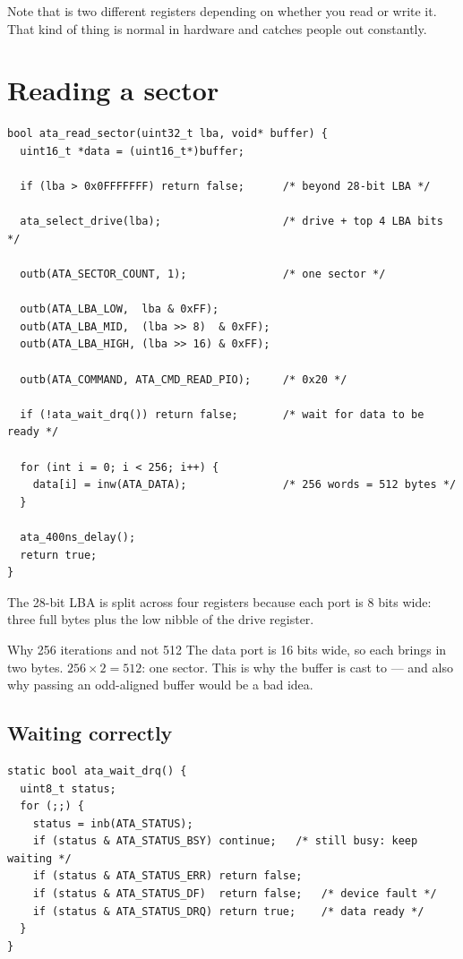 Note that  is two different registers depending on whether you read or write it. That kind
of thing is normal in hardware and catches people out constantly.

\section{Reading a sector}

\begin{lstlisting}[style=c]
bool ata_read_sector(uint32_t lba, void* buffer) {
  uint16_t *data = (uint16_t*)buffer;

  if (lba > 0x0FFFFFFF) return false;      /* beyond 28-bit LBA */

  ata_select_drive(lba);                   /* drive + top 4 LBA bits */

  outb(ATA_SECTOR_COUNT, 1);               /* one sector */

  outb(ATA_LBA_LOW,  lba & 0xFF);
  outb(ATA_LBA_MID,  (lba >> 8)  & 0xFF);
  outb(ATA_LBA_HIGH, (lba >> 16) & 0xFF);

  outb(ATA_COMMAND, ATA_CMD_READ_PIO);     /* 0x20 */

  if (!ata_wait_drq()) return false;       /* wait for data to be ready */

  for (int i = 0; i < 256; i++) {
    data[i] = inw(ATA_DATA);               /* 256 words = 512 bytes */
  }

  ata_400ns_delay();
  return true;
}
\end{lstlisting}

The 28-bit LBA is split across four registers because each port is 8 bits wide: three full bytes
plus the low nibble of the drive register.

\begin{concept}{Why 256 iterations and not 512}
The data port is 16 bits wide, so each  brings in two bytes. $256 \times 2 = 512$: one
sector. This is why the buffer is cast to  --- and also why passing an odd-aligned
buffer would be a bad idea.
\end{concept}

\subsection{Waiting correctly}

\begin{lstlisting}[style=c]
static bool ata_wait_drq() {
  uint8_t status;
  for (;;) {
    status = inb(ATA_STATUS);
    if (status & ATA_STATUS_BSY) continue;   /* still busy: keep waiting */
    if (status & ATA_STATUS_ERR) return false;
    if (status & ATA_STATUS_DF)  return false;   /* device fault */
    if (status & ATA_STATUS_DRQ) return true;    /* data ready */
  }
}
\end{lstlisting}

